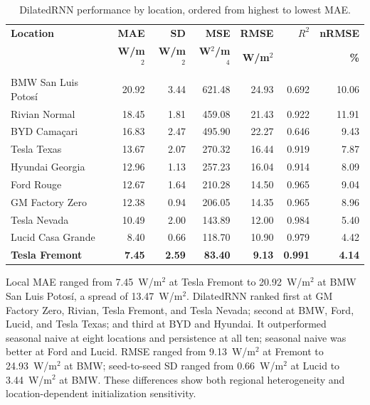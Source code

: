 \documentclass[runningheads]{llncs}
\begin{document}
\begin{table}[t]
\caption{DilatedRNN performance by location, ordered from highest to lowest MAE.}
\label{tab:local}
\centering
\scriptsize
\setlength{\tabcolsep}{2.7pt}
\begin{tabular}{@{}>{\raggedright\arraybackslash}p{3.05cm}rrrrrr@{}}
\toprule
\textbf{Location} & \textbf{MAE} & \textbf{SD} & \textbf{MSE} & \textbf{RMSE} & \textbf{$R^2$} & \textbf{nRMSE} \\
 & \textbf{W/m$^2$} & \textbf{W/m$^2$} & \textbf{W$^2$/m$^4$} & \textbf{W/m$^2$} & & \textbf{\%} \\
\midrule
BMW San Luis Potosí & 20.92 & 3.44 & 621.48 & 24.93 & 0.692 & 10.06 \\
Rivian Normal       & 18.45 & 1.81 & 459.08 & 21.43 & 0.922 & 11.91 \\
BYD Camaçari        & 16.83 & 2.47 & 495.90 & 22.27 & 0.646 & 9.43 \\
Tesla Texas         & 13.67 & 2.07 & 270.32 & 16.44 & 0.919 & 7.87 \\
Hyundai Georgia     & 12.96 & 1.13 & 257.23 & 16.04 & 0.914 & 8.09 \\
Ford Rouge          & 12.67 & 1.64 & 210.28 & 14.50 & 0.965 & 9.04 \\
GM Factory Zero     & 12.38 & 0.94 & 206.05 & 14.35 & 0.965 & 8.96 \\
Tesla Nevada        & 10.49 & 2.00 & 143.89 & 12.00 & 0.984 & 5.40 \\
Lucid Casa Grande   & 8.40  & 0.66 & 118.70 & 10.90 & 0.979 & 4.42 \\
\textbf{Tesla Fremont} & \textbf{7.45} & \textbf{2.59} & \textbf{83.40} & \textbf{9.13} & \textbf{0.991} & \textbf{4.14} \\
\bottomrule
\end{tabular}
\end{table}

Local MAE ranged from 7.45~W/m$^2$ at Tesla Fremont to 20.92~W/m$^2$ at BMW San Luis Potosí, a spread of 13.47~W/m$^2$. DilatedRNN ranked first at GM Factory Zero, Rivian, Tesla Fremont, and Tesla Nevada; second at BMW, Ford, Lucid, and Tesla Texas; and third at BYD and Hyundai. It outperformed seasonal naive at eight locations and persistence at all ten; seasonal naive was better at Ford and Lucid. RMSE ranged from 9.13~W/m$^2$ at Fremont to 24.93~W/m$^2$ at BMW; seed-to-seed SD ranged from 0.66~W/m$^2$ at Lucid to 3.44~W/m$^2$ at BMW. These differences show both regional heterogeneity and location-dependent initialization sensitivity.
\end{document}
